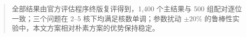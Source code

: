 \begin{abstract}
全部结果由官方评估程序终版复评得到，1{,}400 个主结果与 500 组配对逐位一致；三个问题在 2--5 核下均满足核数单调；参数扰动 $\pm20\%$ 的鲁棒性实验中，本文方案相对朴素方案的优势保持稳定。

\end{abstract}
